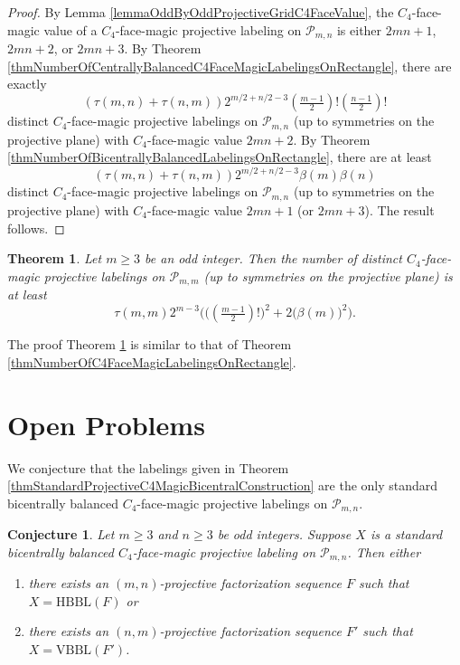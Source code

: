 \documentclass[12pt]{amsart}
\theoremstyle{definition}
\theoremstyle{plain}
\newtheorem{theorem}[definition]{Theorem}
\newtheorem{conjecture}[definition]{Conjecture}
\begin{document}
\begin{proof}
   By Lemma \ref{lemmaOddByOddProjectiveGridC4FaceValue}, the $C_4$-face-magic value of a $C_4$-face-magic projective labeling on
   $\mathcal{P}_{m,n}$ is either $2mn+1$, $2mn+2$, or $2mn+3$.
   By Theorem \ref{thmNumberOfCentrallyBalancedC4FaceMagicLabelingsOnRectangle}, there are exactly
   \begin{equation*}
    ( \tau(m,n) + \tau(n,m) )2^{m/2 +n/2-3} (\tfrac{m-1}{2})! (\tfrac{n-1}{2})!
   \end{equation*}
   distinct $C_4$-face-magic projective labelings on $\mathcal{P}_{m,n}$
  (up to symmetries on the projective plane) with $C_4$-face-magic value $2mn+2$.
  By Theorem \ref{thmNumberOfBicentrallyBalancedLabelingsOnRectangle}, there are at least
   \begin{equation*}
    ( \tau(m,n) + \tau(n,m) ) 2^{m/2+n/2-3} \beta(m)  \beta(n)
   \end{equation*}
   distinct $C_4$-face-magic projective labelings on $\mathcal{P}_{m,n}$
  (up to symmetries on the projective plane) with $C_4$-face-magic value $2mn+1$ (or $2mn+3$).
  The result follows.
\end{proof}


\begin{theorem} \label{thmNumberOfC4FaceMagicLabelingsOnSquare}
  Let $m \geqslant 3$ be an odd integer.
  Then the number of distinct $C_4$-face-magic projective labelings on $\mathcal{P}_{m,m}$
  (up to symmetries on the projective plane) is at least
  \begin{equation*}
    \tau(m,m)  2^{m-3} \bigl(  \bigl( (\tfrac{m-1}{2})! \bigr)^2 + 2 \bigl( \beta(m) \bigr)^2 \bigr).
  \end{equation*}
\end{theorem}

  The proof Theorem \ref{thmNumberOfC4FaceMagicLabelingsOnSquare} is similar to that of Theorem \ref{thmNumberOfC4FaceMagicLabelingsOnRectangle}.


\section{Open Problems}

We conjecture that the labelings given in Theorem \ref{thmStandardProjectiveC4MagicBicentralConstruction} are the only standard bicentrally balanced
$C_4$-face-magic projective labelings on $\mathcal{P}_{m,n}$.

\begin{conjecture}
Let $m \geqslant 3$ and $n \geqslant 3$ be odd integers.
Suppose $X$ is a standard bicentrally balanced $C_4$-face-magic projective labeling on $\mathcal{P}_{m,n}$.
Then either
\begin{enumerate}
  \item there exists an $(m,n)$-projective factorization sequence $F$ such that $X=\mbox{HBBL}(F)$ or
  \item there exists an $(n,m)$-projective factorization sequence $F'$ such that $X=\mbox{VBBL}(F')$.
\end{enumerate}
\end{conjecture}
\end{document}
